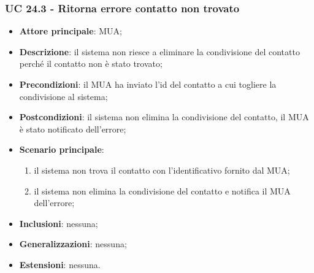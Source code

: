 \subsubsection{UC 24.3 - Ritorna errore contatto non trovato} \label{sec:UC24.3}
    \begin{itemize}
        \item \textbf{Attore principale}: MUA;
        \item \textbf{Descrizione}: il sistema non riesce a eliminare la condivisione del contatto perché il contatto non è stato trovato;
        \item \textbf{Precondizioni}: il MUA ha inviato l'id del contatto a cui togliere la condivisione al sistema;
        \item \textbf{Postcondizioni}: il sistema non elimina la condivisione del contatto, il MUA è stato notificato dell'errore;
        \item \textbf{Scenario principale}:
            \begin{enumerate}
                \item il sistema non trova il contatto con l'identificativo fornito dal MUA;
                \item il sistema non elimina la condivisione del contatto e notifica il MUA dell'errore;
            \end{enumerate}
        \item \textbf{Inclusioni}: nessuna;
        \item \textbf{Generalizzazioni}: nessuna;
        \item \textbf{Estensioni}: nessuna.
    \end{itemize}

